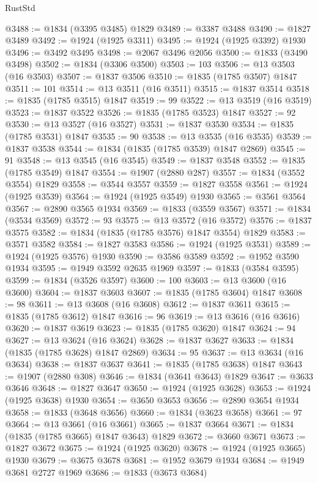 \begin{lexlean}{RustStd}
\begin{coremodule}
{\begin{coremodule}
{{{{{@3488 := @1834 (@3395 @3485) @1829
@3489 := @3387 @3488
@3490 := @1827 @3489
@3492 := @1924 (@1925 @3311)
@3495 := @1924 (@1925 @3392) @1930
@3496 := @3492 @3495
@3498 := @2067 @3496 @2056
@3500 := @1833 (@3490 @3498)
@3502 := @1834 (@3306 @3500)
@3503 := 103
@3506 := @13 @3503 (@16 @3503)
@3507 := @1837 @3506
@3510 := @1835 (@1785 @3507) @1847
@3511 := 101
@3514 := @13 @3511 (@16 @3511)
@3515 := @1837 @3514
@3518 := @1835 (@1785 @3515) @1847
@3519 := 99
@3522 := @13 @3519 (@16 @3519)
@3523 := @1837 @3522
@3526 := @1835 (@1785 @3523) @1847
@3527 := 92
@3530 := @13 @3527 (@16 @3527)
@3531 := @1837 @3530
@3534 := @1835 (@1785 @3531) @1847
@3535 := 90
@3538 := @13 @3535 (@16 @3535)
@3539 := @1837 @3538
@3544 := @1834 (@1835 (@1785 @3539) @1847 @2869)
@3545 := 91
@3548 := @13 @3545 (@16 @3545)
@3549 := @1837 @3548
@3552 := @1835 (@1785 @3549) @1847
@3554 := @1907 (@2880 @287)
@3557 := @1834 (@3552 @3554) @1829
@3558 := @3544 @3557
@3559 := @1827 @3558
@3561 := @1924 (@1925 @3539)
@3564 := @1924 (@1925 @3549) @1930
@3565 := @3561 @3564
@3567 := @2890 @3565 @1934
@3569 := @1833 (@3559 @3567)
@3571 := @1834 (@3534 @3569)
@3572 := 93
@3575 := @13 @3572 (@16 @3572)
@3576 := @1837 @3575
@3582 := @1834 (@1835 (@1785 @3576) @1847 @3554) @1829
@3583 := @3571 @3582
@3584 := @1827 @3583
@3586 := @1924 (@1925 @3531)
@3589 := @1924 (@1925 @3576) @1930
@3590 := @3586 @3589
@3592 := @1952 @3590 @1934
@3595 := @1949 @3592 @2635 @1969
@3597 := @1833 (@3584 @3595)
@3599 := @1834 (@3526 @3597)
@3600 := 100
@3603 := @13 @3600 (@16 @3600)
@3604 := @1837 @3603
@3607 := @1835 (@1785 @3604) @1847
@3608 := 98
@3611 := @13 @3608 (@16 @3608)
@3612 := @1837 @3611
@3615 := @1835 (@1785 @3612) @1847
@3616 := 96
@3619 := @13 @3616 (@16 @3616)
@3620 := @1837 @3619
@3623 := @1835 (@1785 @3620) @1847
@3624 := 94
@3627 := @13 @3624 (@16 @3624)
@3628 := @1837 @3627
@3633 := @1834 (@1835 (@1785 @3628) @1847 @2869)
@3634 := 95
@3637 := @13 @3634 (@16 @3634)
@3638 := @1837 @3637
@3641 := @1835 (@1785 @3638) @1847
@3643 := @1907 (@2880 @308)
@3646 := @1834 (@3641 @3643) @1829
@3647 := @3633 @3646
@3648 := @1827 @3647
@3650 := @1924 (@1925 @3628)
@3653 := @1924 (@1925 @3638) @1930
@3654 := @3650 @3653
@3656 := @2890 @3654 @1934
@3658 := @1833 (@3648 @3656)
@3660 := @1834 (@3623 @3658)
@3661 := 97
@3664 := @13 @3661 (@16 @3661)
@3665 := @1837 @3664
@3671 := @1834 (@1835 (@1785 @3665) @1847 @3643) @1829
@3672 := @3660 @3671
@3673 := @1827 @3672
@3675 := @1924 (@1925 @3620)
@3678 := @1924 (@1925 @3665) @1930
@3679 := @3675 @3678
@3681 := @1952 @3679 @1934
@3684 := @1949 @3681 @2727 @1969
@3686 := @1833 (@3673 @3684)
}}}}}
\end{coremodule}}
\end{coremodule}
\end{lexlean}
